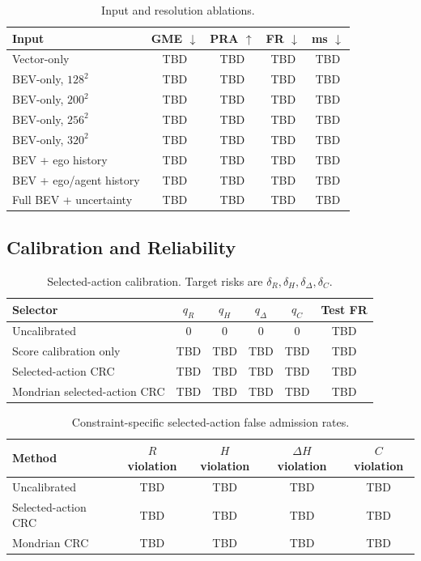 \documentclass[conference]{IEEEtran}
\begin{document}
\begin{table}[t]
\centering
\caption{Input and resolution ablations.}
\label{tab:bev_ablation}
\begin{tabular}{lcccc}
\toprule
Input & GME $\downarrow$ & PRA $\uparrow$ & FR $\downarrow$ & ms $\downarrow$ \\
\midrule
Vector-only & TBD & TBD & TBD & TBD \\
BEV-only, $128^2$ & TBD & TBD & TBD & TBD \\
BEV-only, $200^2$ & TBD & TBD & TBD & TBD \\
BEV-only, $256^2$ & TBD & TBD & TBD & TBD \\
BEV-only, $320^2$ & TBD & TBD & TBD & TBD \\
BEV + ego history & TBD & TBD & TBD & TBD \\
BEV + ego/agent history & TBD & TBD & TBD & TBD \\
Full BEV + uncertainty & TBD & TBD & TBD & TBD \\
\bottomrule
\end{tabular}
\end{table}

\subsection{Calibration and Reliability}
\label{subsec:calibration_results}

\begin{table}[t]
\centering
\caption{Selected-action calibration.  Target risks are $\delta_R,\delta_H,\delta_\Delta,\delta_C$.}
\label{tab:calibration_results}
\begin{tabular}{lccccc}
\toprule
Selector & $q_R$ & $q_H$ & $q_\Delta$ & $q_C$ & Test FR \\
\midrule
Uncalibrated & $0$ & $0$ & $0$ & $0$ & TBD \\
Score calibration only & TBD & TBD & TBD & TBD & TBD \\
Selected-action CRC & TBD & TBD & TBD & TBD & TBD \\
Mondrian selected-action CRC & TBD & TBD & TBD & TBD & TBD \\
\bottomrule
\end{tabular}
\end{table}

\begin{table}[t]
\centering
\caption{Constraint-specific selected-action false admission rates.}
\label{tab:constraint_calibration}
\begin{tabular}{lcccc}
\toprule
Method & $R$ violation & $H$ violation & $\Delta H$ violation & $C$ violation \\
\midrule
Uncalibrated & TBD & TBD & TBD & TBD \\
Selected-action CRC & TBD & TBD & TBD & TBD \\
Mondrian CRC & TBD & TBD & TBD & TBD \\
\bottomrule
\end{tabular}
\end{table}
\end{document}
